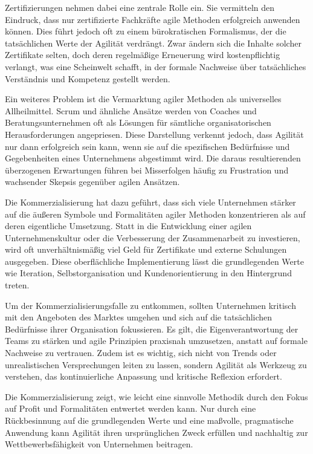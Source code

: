 \documentclass[ngerman]{seminarvorlage}
\begin{document}
Zertifizierungen nehmen dabei eine zentrale Rolle ein. Sie vermitteln den Eindruck, dass nur zertifizierte Fachkräfte agile Methoden erfolgreich anwenden können. Dies führt jedoch oft zu einem bürokratischen Formalismus, der die tatsächlichen Werte der Agilität verdrängt. Zwar ändern sich die Inhalte solcher Zertifikate selten, doch deren regelmäßige Erneuerung wird kostenpflichtig verlangt, was eine Scheinwelt schafft, in der formale Nachweise über tatsächliches Verständnis und Kompetenz gestellt werden.

Ein weiteres Problem ist die Vermarktung agiler Methoden als universelles Allheilmittel. Scrum und ähnliche Ansätze werden von Coaches und Beratungsunternehmen oft als Lösungen für sämtliche organisatorischen Herausforderungen angepriesen. Diese Darstellung verkennt jedoch, dass Agilität nur dann erfolgreich sein kann, wenn sie auf die spezifischen Bedürfnisse und Gegebenheiten eines Unternehmens abgestimmt wird. Die daraus resultierenden überzogenen Erwartungen führen bei Misserfolgen häufig zu Frustration und wachsender Skepsis gegenüber agilen Ansätzen.

Die Kommerzialisierung hat dazu geführt, dass sich viele Unternehmen stärker auf die äußeren Symbole und Formalitäten agiler Methoden konzentrieren als auf deren eigentliche Umsetzung. Statt in die Entwicklung einer agilen Unternehmenskultur oder die Verbesserung der Zusammenarbeit zu investieren, wird oft unverhältnismäßig viel Geld für Zertifikate und externe Schulungen ausgegeben. Diese oberflächliche Implementierung lässt die grundlegenden Werte wie Iteration, Selbstorganisation und Kundenorientierung in den Hintergrund treten.

Um der Kommerzialisierungsfalle zu entkommen, sollten Unternehmen kritisch mit den Angeboten des Marktes umgehen und sich auf die tatsächlichen Bedürfnisse ihrer Organisation fokussieren. Es gilt, die Eigenverantwortung der Teams zu stärken und agile Prinzipien praxisnah umzusetzen, anstatt auf formale Nachweise zu vertrauen. Zudem ist es wichtig, sich nicht von Trends oder unrealistischen Versprechungen leiten zu lassen, sondern Agilität als Werkzeug zu verstehen, das kontinuierliche Anpassung und kritische Reflexion erfordert.

Die Kommerzialisierung zeigt, wie leicht eine sinnvolle Methodik durch den Fokus auf Profit und Formalitäten entwertet werden kann. Nur durch eine Rückbesinnung auf die grundlegenden Werte und eine maßvolle, pragmatische Anwendung kann Agilität ihren ursprünglichen Zweck erfüllen und nachhaltig zur Wettbewerbsfähigkeit von Unternehmen beitragen.
\cite{heise.2024}
\end{document}
